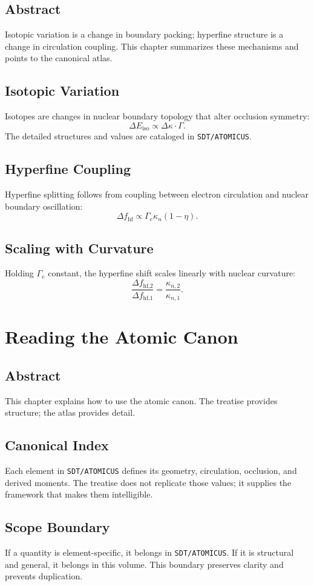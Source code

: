 \documentclass[12pt]{book}
\begin{document}
\section*{Abstract}
Isotopic variation is a change in boundary packing; hyperfine structure is a change in circulation
coupling. This chapter summarizes these mechanisms and points to the canonical atlas.

\section{Isotopic Variation}
Isotopes are changes in nuclear boundary topology that alter occlusion symmetry:
\begin{equation}
\Delta E_{\text{iso}} \propto \Delta \kappa \cdot \Gamma.
\end{equation}
The detailed structures and values are cataloged in \texttt{SDT/ATOMICUS}.

\section{Hyperfine Coupling}
Hyperfine splitting follows from coupling between electron circulation and nuclear boundary oscillation:
\begin{equation}
\Delta f_{\text{hf}} \propto \Gamma_e \kappa_n (1-\eta).
\end{equation}

\section{Scaling with Curvature}
Holding $\Gamma_e$ constant, the hyperfine shift scales linearly with nuclear curvature:
\begin{equation}
\frac{\Delta f_{\text{hf,2}}}{\Delta f_{\text{hf,1}}} = \frac{\kappa_{n,2}}{\kappa_{n,1}}.
\end{equation}

\chapter{Reading the Atomic Canon}

\section*{Abstract}
This chapter explains how to use the atomic canon. The treatise provides structure; the atlas provides
detail.

\section{Canonical Index}
Each element in \texttt{SDT/ATOMICUS} defines its geometry, circulation, occlusion, and derived moments.
The treatise does not replicate those values; it supplies the framework that makes them intelligible.

\section{Scope Boundary}
If a quantity is element-specific, it belongs in \texttt{SDT/ATOMICUS}. If it is structural and general,
it belongs in this volume. This boundary preserves clarity and prevents duplication.
\end{document}
